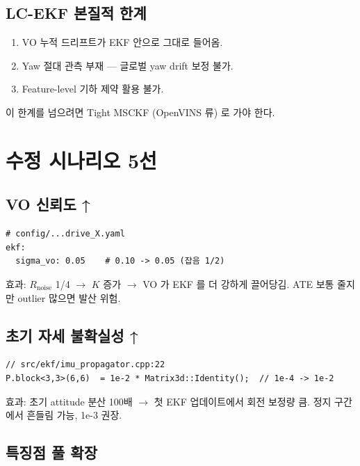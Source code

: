 \documentclass[11pt,a4paper,oneside]{report}
\begin{document}
\section{LC-EKF 본질적 한계}

\begin{enumerate}
\item VO 누적 드리프트가 EKF 안으로 그대로 들어옴.
\item Yaw 절대 관측 부재 — 글로벌 yaw drift 보정 불가.
\item Feature-level 기하 제약 활용 불가.
\end{enumerate}

이 한계를 넘으려면 Tight MSCKF (OpenVINS 류) 로 가야 한다.


\chapter{수정 시나리오 5선}

\section{VO 신뢰도 ↑}

\begin{lstlisting}[style=yaml]
# config/...drive_X.yaml
ekf:
  sigma_vo: 0.05    # 0.10 -> 0.05 (잡음 1/2)
\end{lstlisting}

효과: \(R_{\text{noise}}\) 1/4 \(\to\) \(K\) 증가 \(\to\) VO 가 EKF 를 더 강하게 끌어당김. ATE 보통 줄지만 outlier 많으면 발산 위험.

\section{초기 자세 불확실성 ↑}

\begin{lstlisting}[style=cpp]
// src/ekf/imu_propagator.cpp:22
P.block<3,3>(6,6)  = 1e-2 * Matrix3d::Identity();  // 1e-4 -> 1e-2
\end{lstlisting}

효과: 초기 attitude 분산 100배 \(\to\) 첫 EKF 업데이트에서 회전 보정량 큼. 정지 구간에서 흔들림 가능, 1e-3 권장.

\section{특징점 풀 확장}
\end{document}
